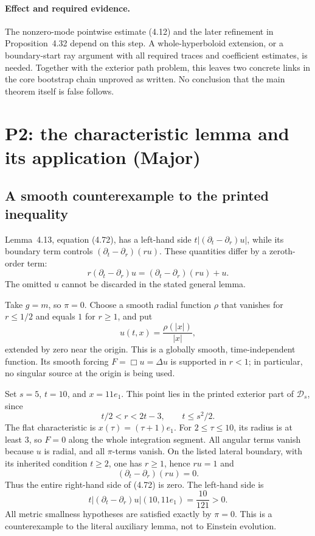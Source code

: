 \documentclass[10pt]{article}
\begin{document}
\paragraph*{Effect and required evidence.}\mbox{}\par
The nonzero-mode pointwise estimate (4.12) and the later refinement in Proposition 4.32 depend on this step. A whole-hyperboloid extension, or a boundary-start ray argument with all required traces and coefficient estimates, is needed. Together with the exterior path problem, this leaves two concrete links in the core bootstrap chain unproved as written. No conclusion that the main theorem itself is false follows.\par
\section*{P2: the characteristic lemma and its application (Major)}
\subsection*{A smooth counterexample to the printed inequality}
Lemma 4.13, equation (4.72), has a left-hand side \(t|(\partial_t-\partial_r)u|\), while its boundary term controls \((\partial_t-\partial_r)(ru)\). These quantities differ by a zeroth-order term: \[r(\partial_t-\partial_r)u
 =(\partial_t-\partial_r)(ru)+u.\] The omitted \(u\) cannot be discarded in the stated general lemma.\par
Take \(g=m\), so \(\pi=0\). Choose a smooth radial function \(\rho\) that vanishes for \(r\leq1/2\) and equals \(1\) for \(r\geq1\), and put \[u(t,x)=\frac{\rho(|x|)}{|x|},\] extended by zero near the origin. This is a globally smooth, time-independent function. Its smooth forcing \(F=\Box u=\Delta u\) is supported in \(r<1\); in particular, no singular source at the origin is being used.\par
Set \(s=5\), \(t=10\), and \(x=11e_1\). This point lies in the printed exterior part of \(\mathcal D_s\), since \[t/2<r<2t-3,\qquad t\leq s^2/2.\] The flat characteristic is \(x(\tau)=(\tau+1)e_1\). For \(2\leq\tau\leq10\), its radius is at least \(3\), so \(F=0\) along the whole integration segment. All angular terms vanish because \(u\) is radial, and all \(\pi\)-terms vanish. On the listed lateral boundary, with its inherited condition \(t\geq2\), one has \(r\geq1\), hence \(ru=1\) and \[(\partial_t-\partial_r)(ru)=0.\] Thus the entire right-hand side of (4.72) is zero. The left-hand side is \[t|(\partial_t-\partial_r)u|(10,11e_1)
 =\frac{10}{121}>0.\] All metric smallness hypotheses are satisfied exactly by \(\pi=0\). This is a counterexample to the literal auxiliary lemma, not to Einstein evolution.\par
\end{document}
